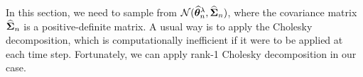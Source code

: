 In this section, we need to sample from $\mathcal{N}(\widehat{{\boldsymbol \theta}}^\lambda_n,\widehat{{\boldsymbol \Sigma}}_n)$, where the covariance matrix $\widehat{{\boldsymbol \Sigma}}_n$ is a positive-definite matrix. A usual way is to apply the Cholesky decomposition, which is computationally inefficient if it were to be applied at each time step. Fortunately, we can apply rank-1 Cholesky decomposition in our case.  






